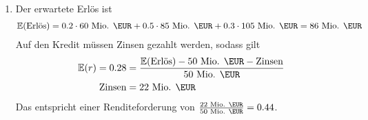 \documentclass{article}
\newcommand{\E}{\mathbb{E}}
\begin{document}
\begin{enumerate}[label=(\alph*)]
		\item Der erwartete Erlös ist
		\begin{align}
			\E(\text{Erlös}) = 0.2\cdot 60 \text{ Mio. \EUR} + 0.5 \cdot 85\text{ Mio. \EUR} + 0.3\cdot 105\text{ Mio. \EUR} = 86 \text{ Mio. \EUR} \notag
		\end{align}
		Auf den Kredit müssen Zinsen gezahlt werden, sodass gilt
		\begin{align}
			\E(r) = 0.28 &= \frac{\E(\text{Erlös}) - 50\text{ Mio. \EUR} - \text{Zinsen}}{50\text{ Mio. \EUR}} \notag \\
			\text{Zinsen} &= 22\text{ Mio. \EUR} \notag
		\end{align}
		Das entspricht einer Renditeforderung von $\frac{22\text{ Mio. \EUR}}{50 \text{ Mio. \EUR}} = 0.44$.
	\end{enumerate}
	
\end{document}
